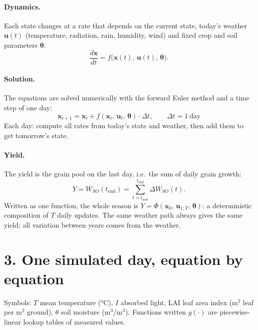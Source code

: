 \documentclass[11pt,a4paper]{article}
\begin{document}
\paragraph{Dynamics.} Each state changes at a rate that depends on the current state, today's weather
\(\mathbf{u}(t)\) (temperature, radiation, rain, humidity, wind) and fixed crop and soil parameters \(\boldsymbol\theta\):
\begin{equation}
  \frac{d\mathbf{x}}{dt} = f\big(\mathbf{x}(t),\, \mathbf{u}(t),\, \boldsymbol\theta\big).
\end{equation}

\paragraph{Solution.} The equations are solved numerically with the forward Euler method and a time step of one day:
\begin{equation}
  \boxed{\ \mathbf{x}_{t+1} = \mathbf{x}_t + f(\mathbf{x}_t,\, \mathbf{u}_t,\, \boldsymbol\theta)\cdot \Delta t,
  \qquad \Delta t = 1\ \text{day}\ }
\end{equation}
Each day: compute all rates from today's state and weather, then add them to get tomorrow's state.

\paragraph{Yield.} The yield is the grain pool on the last day, i.e.\ the sum of daily grain growth:
\begin{equation}
  Y = W_{SO}(t_{\mathrm{end}}) = \sum_{t = t_{\mathrm{sow}}}^{t_{\mathrm{end}}} \Delta W_{SO}(t).
\end{equation}
Written as one function, the whole season is \(Y = \Phi(\mathbf{x}_0,\, \mathbf{u}_{1:T},\, \boldsymbol\theta)\): a
deterministic composition of \(T\) daily updates. The same weather path always gives the same yield; all variation
between years comes from the weather.

\section*{3. One simulated day, equation by equation}

Symbols: \(T\) mean temperature (°C), \(I\) absorbed light, LAI leaf area index (m\(^2\) leaf per m\(^2\) ground),
\(\theta\) soil moisture (m\(^3\)/m\(^3\)). Functions written \(g(\cdot)\) are piecewise-linear lookup tables of
measured values.
\end{document}
